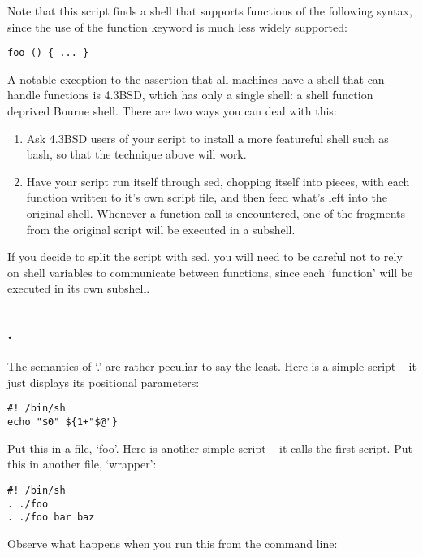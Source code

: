 Note that this script finds a shell that supports functions of the following syntax, since the use of the function keyword is much less widely supported:

\begin{Verbatim}[frame=single]
foo () { ... }
\end{Verbatim}

A notable exception to the assertion that all machines have a shell that can handle functions is 4.3BSD, which has only a single shell: a shell function deprived Bourne shell. There are two ways you can deal with this:

\begin{enumerate}
\item Ask 4.3BSD users of your script to install a more featureful shell such as bash, so that the technique above will work.

\item Have your script run itself through sed, chopping itself into pieces, with each function written to it's own script file, and then feed what's left into the original shell. Whenever a function call is encountered, one of the fragments from the original script will be executed in a subshell. 
\end{enumerate}

If you decide to split the script with sed, you will need to be careful not to rely on shell variables to communicate between functions, since each `function' will be executed in its own subshell. 

\subsection{.}

The semantics of `.' are rather peculiar to say the least. Here is a simple script -- it just displays its positional parameters:

\begin{Verbatim}[frame=single]
#! /bin/sh
echo "$0" ${1+"$@"}
\end{Verbatim}

Put this in a file, `foo'. Here is another simple script -- it calls the first script. Put this in another file, `wrapper':

\begin{Verbatim}[frame=single]
#! /bin/sh
. ./foo
. ./foo bar baz
\end{Verbatim}

Observe what happens when you run this from the command line:

